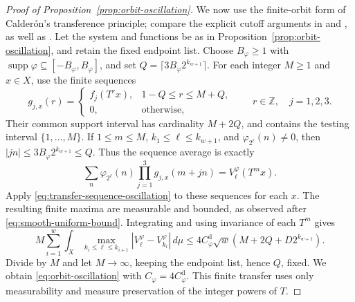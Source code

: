 \begin{proof}[Proof of Proposition~\ref{prop:orbit-oscillation}]
We now use the finite-orbit form of Calder\'on's transference principle;
compare the explicit cutoff arguments in \cite[Section~2B]{Bourgain1989}
and \cite{KMT2022}, as well as \cite{Calderon1968}.
Let the system and functions be as in
Proposition~\ref{prop:orbit-oscillation}, and retain the fixed endpoint
list.  Choose \(B_\varphi\geq1\) with
\(\operatorname{supp}\varphi\subseteq[-B_\varphi,B_\varphi]\), and set
\(Q=\lceil3B_\varphi2^{k_{w+1}}\rceil\).  For each integer \(M\geq1\)
and \(x\in X\), use the finite sequences
\[
 g_{j,x}(r)=
 \begin{cases}
  f_j(T^r x),&1-Q\leq r\leq M+Q,\\
  0,&\text{otherwise},
 \end{cases}
 \qquad r\in\mathbb Z,\quad j=1,2,3.
\]
Their common support interval has cardinality \(M+2Q\), and contains
the testing interval \(\{1,\ldots,M\}\).  If \(1\leq m\leq M\),
\(k_1\leq\ell\leq k_{w+1}\), and \(\varphi_{2^\ell}(n)\neq0\), then
\(|jn|\leq3B_\varphi2^{k_{w+1}}\leq Q\).  Thus the sequence average
is exactly
\[
 \sum_n\varphi_{2^\ell}(n)\prod_{j=1}^3g_{j,x}(m+jn)
    =V_\ell^\varphi(T^m x).
\]
Apply \eqref{eq:transfer-sequence-oscillation} to these sequences for each
\(x\).  The resulting finite maxima are measurable and bounded, as observed
after \eqref{eq:smooth-uniform-bound}.  Integrating and using invariance of
each \(T^m\) gives
\[
 M\sum_{i=1}^w\int_X
    \max_{k_i\leq\ell\leq k_{i+1}}
        |V_\ell^\varphi-V_{k_i}^\varphi|\,d\mu
 \leq 4C_\varphi^{\mathrm d}\sqrt w
        (M+2Q+D2^{k_{w+1}}).
\]
Divide by \(M\) and let \(M\to\infty\), keeping the endpoint
list, hence \(Q\), fixed.  We obtain \eqref{eq:orbit-oscillation} with
\(C_\varphi=4C_\varphi^{\mathrm d}\).  This finite transfer uses only
measurability and measure preservation of the integer powers of \(T\).
\end{proof}
